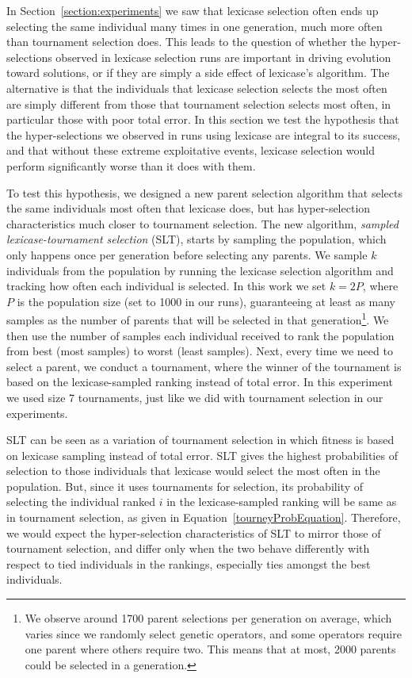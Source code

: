 \documentclass{sig-alternate}
\newcommand{\definition}[1]{\textit{#1}}
\begin{document}
In Section~\ref{section:experiments} we saw that lexicase selection often ends up selecting the same individual many times in one generation, much more often than tournament selection does. This leads to the question of whether the hyper-selections observed in lexicase selection runs are important in driving evolution toward solutions, or if they are simply a side effect of lexicase's algorithm. The alternative is that the individuals that lexicase selection selects the most often are simply different from those that tournament selection selects most often, in particular those with poor total error. In this section we test the hypothesis that the hyper-selections we observed in runs using lexicase are integral to its success, and that without these extreme exploitative events, lexicase selection would perform significantly worse than it does with them.

To test this hypothesis, we designed a new parent selection algorithm that selects the same individuals most often that lexicase does, but has hyper-selection characteristics much closer to tournament selection. The new algorithm, \definition{sampled lexicase-tournament selection} (SLT), starts by sampling the population, which only happens once per generation before selecting any parents. We sample $k$ individuals from the population by running the lexicase selection algorithm and tracking how often each individual is selected. In this work we set $k = 2P$, where $P$ is the population size (set to 1000 in our runs), guaranteeing at least as many samples as the number of parents that will be selected in that generation\footnote{We observe around 1700 parent selections per generation on average, which varies since we randomly select genetic operators, and some operators require one parent where others require two. This means that at most, 2000 parents could be selected in a generation.}. We then use the number of samples each individual received to rank the population from best (most samples) to worst (least samples). Next, every time we need to select a parent, we conduct a tournament, where the winner of the tournament is based on the lexicase-sampled ranking instead of total error. In this experiment we used size 7 tournaments, just like we did with tournament selection in our experiments.

SLT can be seen as a variation of tournament selection in which fitness is based on lexicase sampling instead of total error.
SLT gives the highest probabilities of selection to those individuals that lexicase would select the most often in the population. But, since it uses tournaments for selection, its probability of selecting the individual ranked $i$ in the lexicase-sampled ranking will be same as in tournament selection, as given in Equation~\ref{tourneyProbEquation}. Therefore, we would expect the hyper-selection characteristics of SLT to mirror those of tournament selection, and differ only when the two behave differently with respect to tied individuals in the rankings, especially ties amongst the best individuals.
\end{document}

